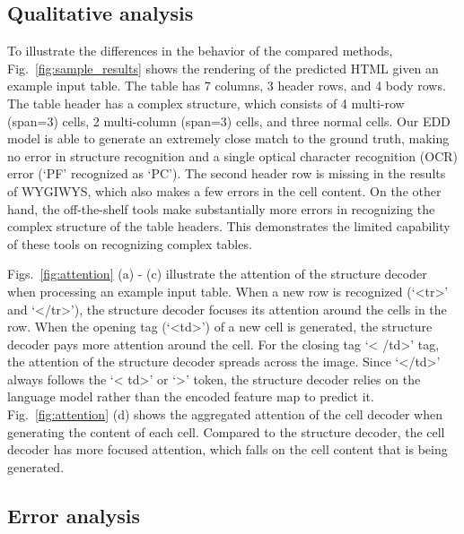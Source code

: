 \documentclass[conference]{IEEEtran}
\begin{document}
\subsection{Qualitative analysis}

To illustrate the differences in the behavior of the compared methods,
Fig.~\ref{fig:sample_results} shows the rendering of the predicted HTML given an
example input table. The table has 7 columns, 3 header rows, and 4 body rows.
The table header has a complex structure, which consists of 4 multi-row (span=3)
cells, 2 multi-column (span=3) cells, and three normal cells. Our EDD model is
able to generate an extremely close match to the ground truth, making no error
in structure recognition and a single optical character recognition (OCR) error
(`PF' recognized as `PC'). The second header row is missing in the results of
WYGIWYS, which also makes a few errors in the cell content. On the other hand,
the off-the-shelf tools make substantially more errors in recognizing the
complex structure of the table headers. This demonstrates the limited capability
of these tools on recognizing complex tables.

Figs.~\ref{fig:attention} (a) - (c) illustrate the attention of the structure
decoder when processing an example input table. When a new row is recognized
(`\textless tr\textgreater' and `\textless /tr\textgreater'), the structure
decoder focuses its attention around the cells in the row. When the opening tag
(`\textless td\textgreater') of a new cell is generated, the structure decoder
pays more attention around the cell. For the closing tag `\textless
/td\textgreater' tag, the attention of the structure decoder spreads across the
image. Since `\textless /td\textgreater' always follows the `\textless
td\textgreater' or `\textgreater' token, the structure decoder relies on the
language model rather than the encoded feature map to predict it.
Fig.~\ref{fig:attention} (d) shows the aggregated attention of the cell decoder
when generating the content of each cell. Compared to the structure decoder, the
cell decoder has more focused attention, which falls on the cell content that is
being generated.

\subsection{Error analysis}
\end{document}
